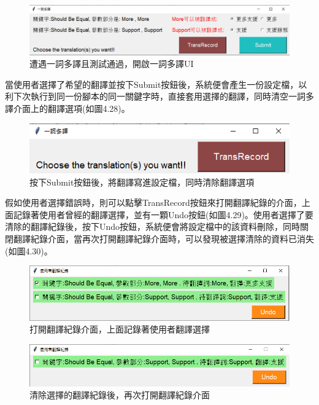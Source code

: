 \begin{figure}[H]
\includegraphics[width= \textwidth]{../論文截圖/4-3-2 測試通過且有一詞多譯時，UI會跳出.png}
\caption{遭遇一詞多譯且測試通過，開啟一詞多譯UI}
\end{figure}

當使用者選擇了希望的翻譯並按下Submit按鈕後，系統便會產生一份設定檔，以利下次執行到同一份腳本的同一關鍵字時，直接套用選擇的翻譯，同時清空一詞多譯介面上的翻譯選項(如圖4.28)。

\begin{figure}[H]
\includegraphics[width= \textwidth]{../論文截圖/4-3-3 選擇翻譯後，清空選項.png}
\caption{按下Submit按鈕後，將翻譯寫進設定檔，同時清除翻譯選項}
\end{figure}

假如使用者選擇錯誤時，則可以點擊TransRecord按鈕來打開翻譯紀錄的介面，上面記錄著使用者曾經的翻譯選擇，並有一顆Undo按鈕(如圖4.29)。使用者選擇了要清除的翻譯紀錄後，按下Undo按鈕，系統便會將設定檔中的該資料刪除，同時關閉翻譯紀錄介面，當再次打開翻譯紀錄介面時，可以發現被選擇清除的資料已消失(如圖4.30)。

\begin{figure}[H]
\centering
\includegraphics[width= \textwidth]{../論文截圖/4-3-4 介面上記錄著使用者翻譯選擇.png}
\caption{打開翻譯紀錄介面，上面記錄著使用者翻譯選擇}
\end{figure}

\begin{figure}[H]
\centering
\includegraphics[width= \textwidth]{../論文截圖/4-3-5 將選擇的翻譯清除後，再次打開翻譯紀錄介面.png}
\caption{清除選擇的翻譯紀錄後，再次打開翻譯紀錄介面}
\end{figure}

